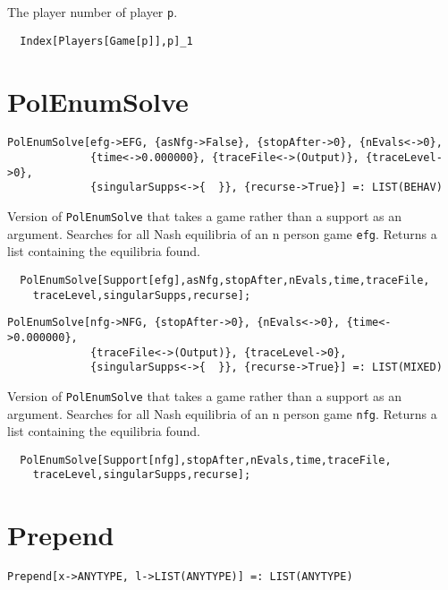 \noindent
The player number of player \verb+p+.

\udfbody
\begin{verbatim}
  Index[Players[Game[p]],p]_1
\end{verbatim} 


\section*{PolEnumSolve}\label{ExtPolEnumSolve}
\begin{verbatim}
PolEnumSolve[efg->EFG, {asNfg->False}, {stopAfter->0}, {nEvals<->0}, 
             {time<->0.000000}, {traceFile<->(Output)}, {traceLevel->0}, 
             {singularSupps<->{  }}, {recurse->True}] =: LIST(BEHAV)
\end{verbatim}

\noindent
Version of \verb+PolEnumSolve+ that takes a game rather than a support
as an argument.  Searches for all Nash equilibria of an n person game
\verb+efg+.  Returns a list containing the equilibria found.

\udfbody
\begin{verbatim}
  PolEnumSolve[Support[efg],asNfg,stopAfter,nEvals,time,traceFile,
    traceLevel,singularSupps,recurse];
\end{verbatim} 

\newsignature

\begin{verbatim}
PolEnumSolve[nfg->NFG, {stopAfter->0}, {nEvals<->0}, {time<->0.000000}, 
             {traceFile<->(Output)}, {traceLevel->0}, 
             {singularSupps<->{  }}, {recurse->True}] =: LIST(MIXED)
\end{verbatim}

\noindent
Version of \verb+PolEnumSolve+ that takes a game rather than a support
as an argument.  Searches for all Nash equilibria of an n person game
\verb+nfg+.  Returns a list containing the equilibria found.

\udfbody
\begin{verbatim}
  PolEnumSolve[Support[nfg],stopAfter,nEvals,time,traceFile,
    traceLevel,singularSupps,recurse];
\end{verbatim} 


\section*{Prepend}\label{ExtPrepend}
\begin{verbatim}
Prepend[x->ANYTYPE, l->LIST(ANYTYPE)] =: LIST(ANYTYPE) 
\end{verbatim}

